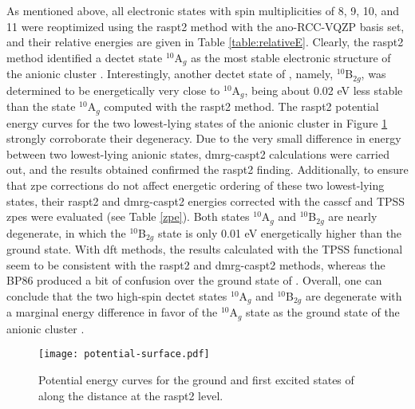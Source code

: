 \begin{refsection}
As mentioned above, all electronic states with spin multiplicities of 8, 9, 10, and 11 were reoptimized using the \acrshort{raspt2} method with the \acrshort{ano}-RCC-VQZP basis set, and their relative energies are given in Table \ref{table:relativeE}. Clearly, the \acrshort{raspt2} method identified a dectet state $^{10}$A$_g$ as the most stable electronic structure of the anionic cluster . Interestingly, another dectet state of , namely, $^{10}$B$_{2g}$, was determined to be energetically very close to $^{10}$A$_g$, being about 0.02 eV less stable than the state $^{10}$A$_g$ computed with the \acrshort{raspt2} method. The \acrshort{raspt2} potential energy curves for the two lowest-lying states of the anionic cluster  in Figure \ref{fig:surface} strongly corroborate their degeneracy. Due to the very small difference in energy between two lowest-lying anionic states, \acrshort{dmrg}-\acrshort{caspt2} calculations were carried out, and the results obtained confirmed the \acrshort{raspt2} finding. Additionally, to ensure that \acrshort{zpe} corrections do not affect energetic ordering of these two lowest-lying states, their \acrshort{raspt2} and \acrshort{dmrg}-\acrshort{caspt2} energies corrected with the \acrshort{casscf} and TPSS \acrshort{zpe}s were evaluated (see Table \ref{zpe}). Both states $^{10}$A$_g$ and $^{10}$B$_{2g}$ are nearly degenerate, in which the $^{10}$B$_{2g}$ state is only 0.01 eV energetically higher than the ground state. With \acrshort{dft} methods, the results calculated with the TPSS functional seem to be consistent with the \acrshort{raspt2} and \acrshort{dmrg}-\acrshort{caspt2} methods, whereas the BP86 produced a bit of confusion over the ground state of . Overall, one can conclude that the two high-spin dectet states $^{10}$A$_g$ and $^{10}$B$_{2g}$ are degenerate with a marginal energy difference in favor of the $^{10}$A$_g$ state as the ground state of the anionic cluster .


\begin{figure}[htb!]
	\centering
	\texttt{[image: potential-surface.pdf]}
	\caption{Potential energy curves for the ground and first excited states of  along the  distance at the \acrshort{raspt2} level.}
	\label{fig:surface}
\end{figure}



\end{refsection}
